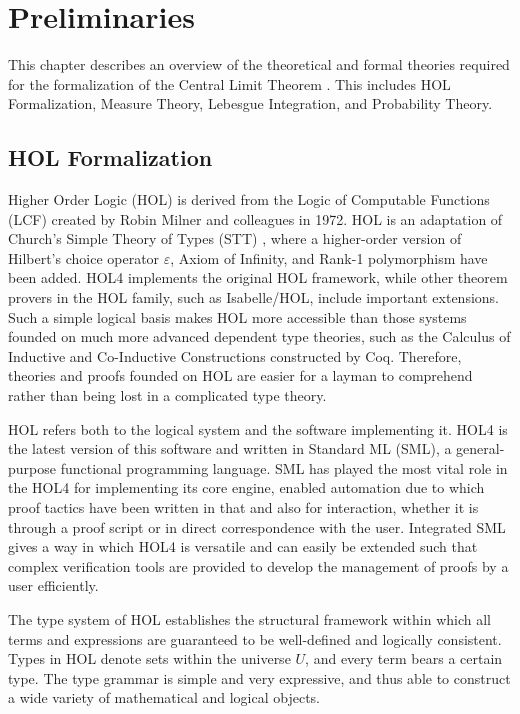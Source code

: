 \chapter[Preliminaries]{Preliminaries}
\label{chap:3}

This chapter describes an overview of the theoretical and formal theories required for the formalization of the Central Limit Theorem . This includes HOL Formalization, Measure Theory, Lebesgue Integration, and Probability Theory.
\section{HOL Formalization}
Higher Order Logic (HOL) \cite{hol4, slind2008brief} is derived from the Logic of Computable Functions (LCF) \cite{gordon1979edinburgh, milner1972logic} created by Robin Milner and colleagues in 1972. HOL is an adaptation of Church's Simple Theory of Types (STT) \cite{church1940formulation}, where a higher-order version of Hilbert's choice operator $\varepsilon $, Axiom of Infinity, and Rank-1 polymorphism have been added. HOL4 implements the original HOL framework, while other theorem provers in the HOL family, such as Isabelle/HOL, include important extensions. Such a simple logical basis makes HOL more accessible than those systems founded on much more advanced dependent type theories, such as the Calculus of Inductive and Co-Inductive Constructions constructed by Coq. Therefore, theories and proofs founded on HOL are easier for a layman to comprehend rather than being lost in a complicated type theory.

HOL refers both to the logical system and the software implementing it. HOL4 is the latest version of this software and written in Standard ML (SML), a general-purpose functional programming language.  SML has played the most vital role in the HOL4 for implementing its core engine, enabled automation due to which proof tactics have been written in that and also for interaction, whether it is through a proof script or in direct correspondence with the user. Integrated SML gives a way in which HOL4 is versatile and can easily be extended such that complex verification tools are provided to develop the management of proofs by a user efficiently.

The type system of HOL establishes the structural framework within which all terms and expressions are guaranteed to be well-defined and logically consistent. Types in HOL denote sets within the universe $ U $, and every term bears a certain type. The type grammar is simple and very expressive, and thus able to construct a wide variety of mathematical and logical objects.

